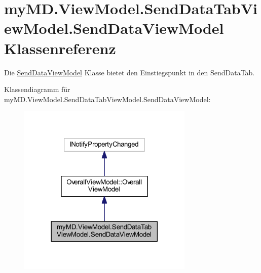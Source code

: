 \hypertarget{classmy_m_d_1_1_view_model_1_1_send_data_tab_view_model_1_1_send_data_view_model}{}\section{my\+M\+D.\+View\+Model.\+Send\+Data\+Tab\+View\+Model.\+Send\+Data\+View\+Model Klassenreferenz}
\label{classmy_m_d_1_1_view_model_1_1_send_data_tab_view_model_1_1_send_data_view_model}


Die \mbox{\hyperlink{classmy_m_d_1_1_view_model_1_1_send_data_tab_view_model_1_1_send_data_view_model}{Send\+Data\+View\+Model}} Klasse bietet den Einstiegspunkt in den Send\+Data\+Tab.  




Klassendiagramm für my\+M\+D.\+View\+Model.\+Send\+Data\+Tab\+View\+Model.\+Send\+Data\+View\+Model\+:
\nopagebreak
\begin{figure}[H]
\begin{center}
\leavevmode
\includegraphics[width=237pt]{classmy_m_d_1_1_view_model_1_1_send_data_tab_view_model_1_1_send_data_view_model__inherit__graph}
\end{center}
\end{figure}


